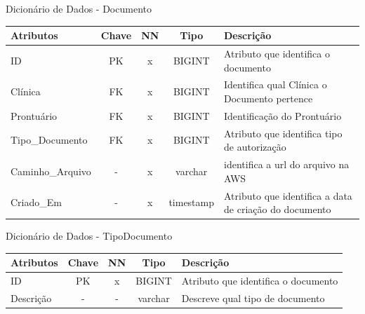 \documentclass[
    12pt,               %
    openright,          %
    oneside,
    a4paper,            %
    BIBLATEX,           %
    TODO,               %
    english,            %
    brazil              %
    ]{ifsp-spo-inf-ctds}
\begin{document}
    \begin{center}
      \begin{quadro}[H]
      \centering
          \caption{Dicionário de Dados - Documento}
          \begin{tabulary}{1.0\textwidth}{|p{9em}|c|c|c|p{19em}|}
        \hline
        Atributos & Chave & NN & Tipo & Descrição\\
        \hline
        ID & PK & x & BIGINT & Atributo que identifica o documento \\
        \hline
        Clínica & FK & x & BIGINT & Identifica qual Clínica o Documento pertence\\
        \hline
        Prontuário & FK & x & BIGINT & Identificação do Prontuário \\
        \hline
        Tipo\_Documento & FK & x & BIGINT & Atributo que identifica tipo  de autorização \\
        \hline
        Caminho\_Arquivo & - & x & varchar & identifica a url do arquivo na AWS\\
        \hline
        Criado\_Em & - & x & timestamp & Atributo que identifica a data de criação do documento\\
        \hline
        \end{tabulary}
         
          \label{qd: md-documento}
      \end{quadro}
    \end{center}
    
    \begin{center}
      \begin{quadro}[H]
      \centering
          \caption{Dicionário de Dados - TipoDocumento}
          \begin{tabulary}{1.0\textwidth}{|p{9em}|c|c|c|p{19em}|}
        \hline
        Atributos & Chave & NN & Tipo & Descrição\\
        \hline
        ID & PK & x & BIGINT & Atributo que identifica o documento\\
        \hline
        Descrição & - & - & varchar & Descreve qual tipo de documento\\
        \hline
        \end{tabulary}
         
          \label{qd: md-tipodocumento}
      \end{quadro}
    \end{center}
    
\end{document}
